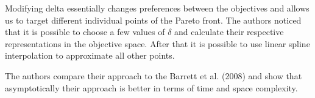 Modifying delta essentially changes preferences between the objectives and allows us to target different individual points of the Pareto front. The authors noticed that it is possible to choose a few values of $ \delta $ and calculate their respective representations in the objective space. After that it is possible to use linear spline interpolation to approximate all other points.

The authors compare their approach to the Barrett et al. (2008)\nocite{barrett2008learning} and show that asymptotically their approach is better in terms of time and space complexity.

























